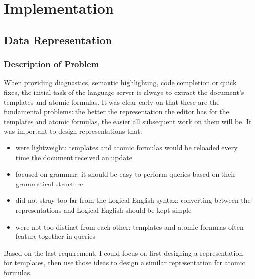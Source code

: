 \documentclass[../main.tex]{subfiles}
\begin{document}
\chapter{Implementation}
\section{Data Representation}
\subsection{Description of Problem}
When providing diagnostics, semantic highlighting, code completion or quick fixes, the initial task of the language server is always to extract the document's templates and atomic formulas. It was clear early on that these are the fundamental problems: the better the representation the editor has for the templates and atomic formulas, the easier all subsequent work on them will be. It was important to design representations that:
\begin{itemize}
    \item were lightweight: templates and atomic formulas would be reloaded every time the document received an update
    \item focused on grammar: it should be easy to perform queries based on their grammatical structure
    \item did not stray too far from the Logical English syntax: converting between the representations and Logical English should be kept simple
    \item were not too distinct from each other: templates and atomic formulas often feature together in queries
\end{itemize}
Based on the last requirement, I could focus on first designing a representation for templates, then use those ideas to design a similar representation for atomic formulas. 
\end{document}

